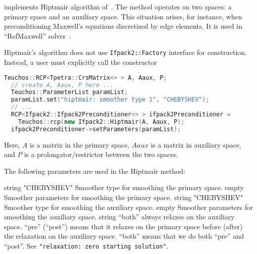 \ifpacktwo{} implements Hiptmair algorithm of~\cite{Hiptmair1997}. The method
operates on two spaces: a primary space and an auxiliary space. This situation
arises, for instance,  when preconditioning Maxwell's equations discretized by
edge elements. It is used in \muelu~\cite{MueLu} ``RefMaxwell''
solver~\cite{RefMaxwell}.

Hiptmair's algorithm does not use \texttt{Ifpack2::Factory} interface for
construction.  Instead, a user must explicitly call the constructor
\begin{lstlisting}[language=C++]
  Teuchos::RCP<Tpetra::CrsMatrix<> > A, Aaux, P;
  // create A, Aaux, P here ...
  Teuchos::ParameterList paramList;
  paramList.set("hiptmair: smoother type 1", "CHEBYSHEV");
  // ...
  RCP<Ifpack2::Ifpack2Preconditioner<> > ifpack2Preconditioner =
    Teuchos::rcp(new Ifpack2::Hiptmair(A, Aaux, P);
  ifpack2Preconditioner->setParameters(paramList);
\end{lstlisting}
\noindent Here, $A$ is a matrix in the primary space, $Aaux$ is a matrix in
auxiliary space, and $P$ is a prolongator/restrictor between the two spaces.

The following parameters are used in the Hiptmair method:

    {string}
    {"CHEBYSHEV"}
    {Smoother type for smoothing the primary space.}
    {\parameterlist}
    {empty}
    {Smoother parameters for smoothing the primary space.}
    {string}
    {"CHEBYSHEV"}
    {Smoother type for smoothing the auxiliary space.}
    {\parameterlist}
    {empty}
    {Smoother parameters for smoothing the auxiliary space.}
    {string}
    {``both''}
    {\ifpacktwo{} always relaxes on the auxiliary space. ``pre'' (``post'') means
     that it relaxes on the primary space before (after) the relaxation on the
     auxiliary space. ``both'' means that we do both ``pre'' and ``post''.}
    {See {\tt "relaxation: zero starting solution"}.}
